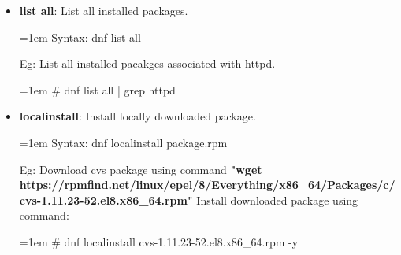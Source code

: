 \begin{flushleft}
\begin{itemize}
		
		\item \textbf{list all}: List all installed packages.
		\begin{tcolorbox}[breakable,notitle,boxrule=-0pt,colback=pink,colframe=pink]
			\color{black}
			\font=1em
			Syntax: dnf list all
			\font=4pt
		\end{tcolorbox}
		Eg: List all installed pacakges associated with httpd.
		\begin{tcolorbox}[breakable,notitle,boxrule=-0pt,colback=black,colframe=black]
			\color{green}
			\font=1em
			\# dnf list all | grep httpd
			\font=4pt
		\end{tcolorbox}
		\bigskip
		\bigskip					

		\item \textbf{localinstall}: Install locally downloaded package.
		\begin{tcolorbox}[breakable,notitle,boxrule=-0pt,colback=pink,colframe=pink]
			\color{black}
			\font=1em
			Syntax: dnf localinstall package.rpm
			\font=4pt
		\end{tcolorbox}
		Eg: Download cvs package using command \textbf{"wget https://rpmfind.net/linux/epel/8/Everything/x86\_64/Packages/c/cvs-1.11.23-52.el8.x86\_64.rpm"}
		\newline
		Install downloaded package using command:		
		\begin{tcolorbox}[breakable,notitle,boxrule=-0pt,colback=black,colframe=black]
			\color{green}
			\font=1em
			\# dnf localinstall cvs-1.11.23-52.el8.x86\_64.rpm -y
			\font=4pt
		\end{tcolorbox}
		\bigskip
		\bigskip					
		
					
	\end{itemize}
	
	
\end{flushleft}
\newpage



